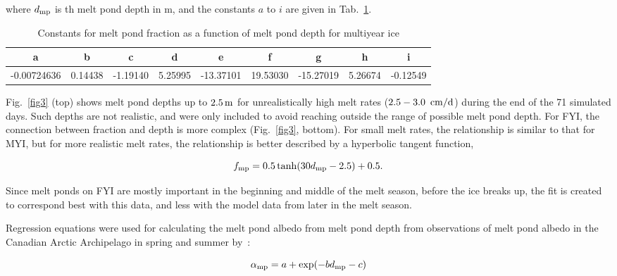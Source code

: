 where $d_{\rm mp}$ is th melt pond depth in m, and the constants $a$
to $i$ are given in Tab.~\ref{tab_meltpondfit}.
\begin{table}[tb]
\begin{scriptsize}
\caption{Constants for melt pond fraction as a function of melt pond
  depth for multiyear ice}\label{tab_meltpondfit}
\begin{tabular*}{\textwidth}{c@{\extracolsep\fill}cccccccc}\hline
a & b & c & d & e & f & g & h & i\\\hline
-0.00724636 & 0.14438 & -1.19140 & 5.25995 & -13.37101 & 19.53030 &
-15.27019 & 5.26674 & -0.12549 \\\hline
\end{tabular*}
\end{scriptsize}
\end{table}
Fig.~\ref{fig3} (top) shows melt pond depths up to $2.5\,{\rm m}$ for
unrealistically high melt rates ($2.5-3.0\,~{\rm cm/d}$) during the
end of the 71 simulated days. Such depths are not realistic, and were
only included to avoid reaching outside the range of possible melt
pond depth. For FYI, the connection between fraction and depth is more
complex (Fig.~\ref{fig3}, bottom). For small melt rates, the
relationship is similar to that for MYI, but for more realistic melt
rates, the relationship is better described by a hyperbolic tangent
function,

\begin{equation}\label{eq_tanh}
f_{\rm mp}=0.5 \tanh(30 d_{\rm mp} - 2.5) + 0.5.
\end{equation}

Since melt ponds on FYI are mostly important in the beginning and
middle of the melt season, before the ice breaks up, the fit is
created to correspond best with this data, and less with the model
data from later in the melt season.

Regression equations were used for calculating the melt pond albedo
from melt pond depth from observations of melt pond albedo in the
Canadian Arctic Archipelago in spring and summer by~\cite{morassutti1996}:

\begin{equation}
\alpha_{\rm mp}=a+\exp(-b d_{\rm mp}-c)
\end{equation}

